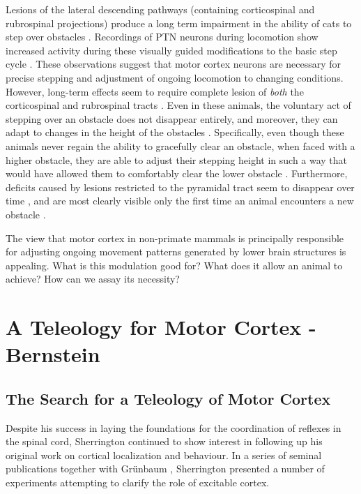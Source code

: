Lesions of the lateral descending pathways (containing corticospinal and rubrospinal projections) produce a long term impairment in the ability of cats to step over obstacles \cite{Drew2002}. Recordings of PTN neurons during locomotion show increased activity during these visually guided modifications to the basic step cycle \cite{Drew1996}. These observations suggest that motor cortex neurons are necessary for precise stepping and adjustment of ongoing locomotion to changing conditions. However, long-term effects seem to require complete lesion of \emph{both} the corticospinal and rubrospinal tracts \cite{Drew2002}. Even in these animals, the voluntary act of stepping over an obstacle does not disappear entirely, and moreover, they can adapt to changes in the height of the obstacles \cite{Drew2002}. Specifically, even though these animals never regain the ability to gracefully clear an obstacle, when faced with a higher obstacle, they are able to adjust their stepping height in such a way that would have allowed them to comfortably clear the lower obstacle \cite{Drew2002}. Furthermore, deficits caused by lesions restricted to the pyramidal tract seem to disappear over time \cite{Liddell1944}, and are most clearly visible only the first time an animal encounters a new obstacle \cite{Liddell1944}.

The view that motor cortex in non-primate mammals is principally responsible for adjusting ongoing movement patterns generated by lower brain structures is appealing. What is this modulation good for? What does it allow an animal to achieve? How can we assay its necessity?

\section{A Teleology for Motor Cortex - Bernstein}

\subsection{The Search for a Teleology of Motor Cortex}

Despite his success in laying the foundations for the coordination of reflexes in the spinal cord, Sherrington continued to show interest in following up his original work on cortical localization and behaviour. In a series of seminal publications together with Gr\"unbaum \cite{Grunbaum1903,Leyton1917}, Sherrington presented a number of experiments attempting to clarify the role of excitable cortex.


